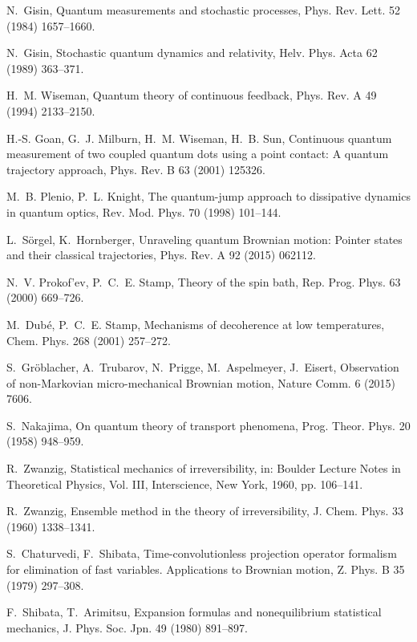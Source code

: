 \documentclass[3p,sort&compress]{elsarticle}
\begin{document}
\begin{thebibliography}{100}
N.~Gisin, Quantum measurements and stochastic processes, Phys. Rev. Lett. 52
  (1984) 1657--1660.

N.~Gisin, Stochastic quantum dynamics and relativity, Helv. Phys. Acta 62
  (1989) 363--371.

H.~M. Wiseman, Quantum theory of continuous feedback, Phys. Rev. A 49 (1994)
  2133--2150.

H.-S. Goan, G.~J. Milburn, H.~M. Wiseman, H.~B. Sun, Continuous quantum
  measurement of two coupled quantum dots using a point contact: A quantum
  trajectory approach, Phys. Rev. B 63 (2001) 125326.

M.~B. Plenio, P.~L. Knight, The quantum-jump approach to dissipative dynamics
  in quantum optics, Rev. Mod. Phys. 70 (1998) 101--144.

L.~S{\"o}rgel, K.~Hornberger, Unraveling quantum {B}rownian motion: {P}ointer
  states and their classical trajectories, Phys. Rev. A 92 (2015) 062112.

N.~V. Prokof'ev, P.~C.~E. Stamp, Theory of the spin bath, Rep. Prog. Phys. 63
  (2000) 669--726.

M.~Dub{\'e}, P.~C.~E. Stamp, Mechanisms of decoherence at low temperatures,
  Chem. Phys. 268 (2001) 257--272.

S.~Gr{\"o}blacher, A.~Trubarov, N.~Prigge, M.~Aspelmeyer, J.~Eisert,
  Observation of non-{M}arkovian micro-mechanical {B}rownian motion, Nature
  Comm. 6 (2015) 7606.

S.~Nakajima, On quantum theory of transport phenomena, Prog. Theor. Phys. 20
  (1958) 948--959.

R.~Zwanzig, Statistical mechanics of irreversibility, in: Boulder Lecture Notes
  in Theoretical Physics, Vol. III, Interscience, New York, 1960, pp. 106--141.

R.~Zwanzig, Ensemble method in the theory of irreversibility, J. Chem. Phys. 33
  (1960) 1338--1341.

S.~Chaturvedi, F.~Shibata, Time-convolutionless projection operator formalism
  for elimination of fast variables. {A}pplications to {B}rownian motion, Z.
  Phys. B 35 (1979) 297--308.

F.~Shibata, T.~Arimitsu, Expansion formulas and nonequilibrium statistical
  mechanics, J. Phys. Soc. Jpn. 49 (1980) 891--897.


\end{thebibliography}
\end{document}
